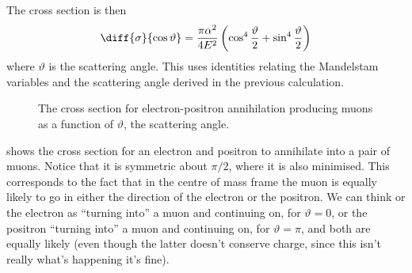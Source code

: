 \documentclass[fleqn]{NotesClass}
\begin{document}
    The cross section is then
    \begin{equation}
        \diff{\sigma}{\cos\vartheta} = \frac{\pi \alpha^2}{4E^2} \left( \cos^4 \frac{\vartheta}{2} + \sin^4\frac{\vartheta}{2} \right)
    \end{equation}
    where \(\vartheta\) is the scattering angle.
    This uses identities relating the Mandelstam variables and the scattering angle derived in the previous calculation.
    
    \begin{figure}
        \caption[Electron-positron annihilation cross section.]{The cross section for electron-positron annihilation producing muons as a function of \(\vartheta\), the scattering angle.}
        \label{fig:electron positron annihilation cross section}
    \end{figure}
    
     shows the cross section for an electron and positron to annihilate into a pair of muons.
    Notice that it is symmetric about \(\pi/2\), where it is also minimised.
    This corresponds to the fact that in the centre of mass frame the muon is equally likely to go in either the direction of the electron or the positron.
    We can think or the electron as \enquote{turning into} a muon and continuing on, for \(\vartheta = 0\), or the positron \enquote{turning into} a muon and continuing on, for \(\vartheta = \pi\), and both are equally likely (even though the latter doesn't conserve charge, since this isn't really what's happening it's fine).
    
\end{document}
